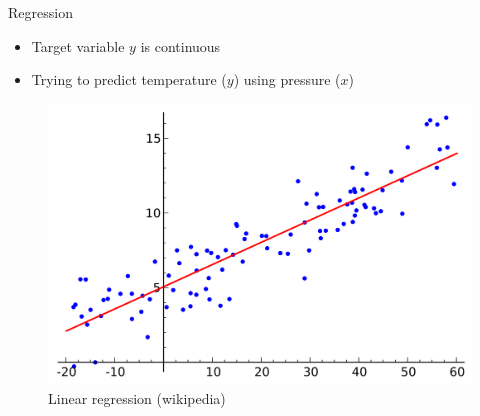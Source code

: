 \documentclass[aspectratio=169]{beamer}
\begin{document}
\begin{frame}{Regression}
    \begin{itemize}
        \item Target variable $y$ is continuous
        \item Trying to predict temperature ($y$) using pressure ($x$)
    \end{itemize}

    \begin{center}
        \begin{figure}
            \includegraphics[scale=0.12]{./images/linear_regression.png}
            \caption{Linear regression (wikipedia)}
        \end{figure}
    \end{center}
\end{frame}
\end{document}
